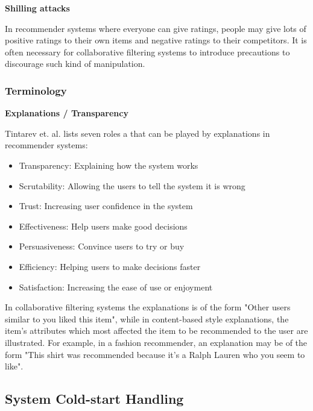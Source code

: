 \textbf{Shilling attacks}

In recommender systems where everyone can give ratings, people may give lots of positive ratings to their own items and negative ratings to their competitors. It is often necessary for collaborative filtering systems to introduce precautions to discourage such kind of manipulation.

\subsubsection{Terminology}

\textbf{Explanations / Transparency}

Tintarev et. al. \cite{Tintarev2007} lists seven roles a that can be played by explanations in recommender systems:

\begin{itemize}
\item Transparency: Explaining how the system works
\item Scrutability: Allowing the users to tell the system it is wrong
\item Trust: Increasing user confidence in the system
\item Effectiveness: Help users make good decisions
\item Persuasiveness: Convince users to try or buy
\item Efficiency: Helping users to make decisions faster
\item Satisfaction: Increasing the ease of use or enjoyment
\end{itemize}

In collaborative filtering systems the explanations is of the form "Other users similar to you liked this item", while in content-based style explanations, the item's attributes which most affected the item to be recommended to the user are illustrated. For example, in a fashion recommender, an explanation may be of the form "This shirt was recommended because it's a Ralph Lauren who you seem to like".

\subsection{System Cold-start Handling}



